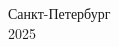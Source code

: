 \begin{titlepage}

    \vspace{\fill}

    \begin{center}
    Санкт-Петербург\\ 2025
    \end{center}

\end{titlepage}